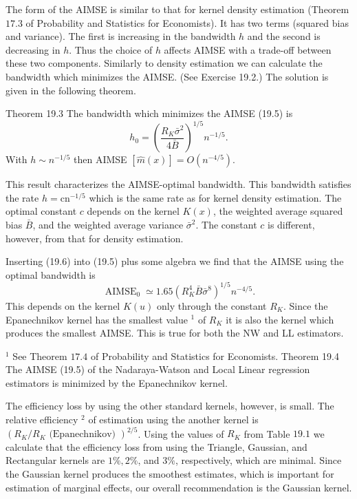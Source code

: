 \documentclass[10pt]{article}
\begin{document}
The form of the AIMSE is similar to that for kernel density estimation (Theorem $17.3$ of Probability and Statistics for Economists). It has two terms (squared bias and variance). The first is increasing in the bandwidth $h$ and the second is decreasing in $h$. Thus the choice of $h$ affects AIMSE with a trade-off between these two components. Similarly to density estimation we can calculate the bandwidth which minimizes the AIMSE. (See Exercise 19.2.) The solution is given in the following theorem.

Theorem 19.3 The bandwidth which minimizes the AIMSE (19.5) is
$$
h_{0}=\left(\frac{R_{K} \bar{\sigma}^{2}}{4 \bar{B}}\right)^{1 / 5} n^{-1 / 5} .
$$
With $h \sim n^{-1 / 5}$ then AIMSE $[\widehat{m}(x)]=O\left(n^{-4 / 5}\right)$.

This result characterizes the AIMSE-optimal bandwidth. This bandwidth satisfies the rate $h=\mathrm{cn}^{-1 / 5}$ which is the same rate as for kernel density estimation. The optimal constant $c$ depends on the kernel $K(x)$, the weighted average squared bias $\bar{B}$, and the weighted average variance $\bar{\sigma}^{2}$. The constant $c$ is different, however, from that for density estimation.

Inserting (19.6) into (19.5) plus some algebra we find that the AIMSE using the optimal bandwidth is
$$
\operatorname{AIMSE}_{0} \simeq 1.65\left(R_{K}^{4} \bar{B} \bar{\sigma}^{8}\right)^{1 / 5} n^{-4 / 5} .
$$
This depends on the kernel $K(u)$ only through the constant $R_{K}$. Since the Epanechnikov kernel has the smallest value ${ }^{1}$ of $R_{K}$ it is also the kernel which produces the smallest AIMSE. This is true for both the NW and LL estimators.

${ }^{1}$ See Theorem $17.4$ of Probability and Statistics for Economists. Theorem 19.4 The AIMSE (19.5) of the Nadaraya-Watson and Local Linear regression estimators is minimized by the Epanechnikov kernel.

The efficiency loss by using the other standard kernels, however, is small. The relative efficiency ${ }^{2}$ of estimation using the another kernel is $\left(R_{K} / R_{K} \text { (Epanechnikov) }\right)^{2 / 5}$. Using the values of $R_{K}$ from Table $19.1$ we calculate that the efficiency loss from using the Triangle, Gaussian, and Rectangular kernels are $1 \%, 2 \%$, and $3 \%$, respectively, which are minimal. Since the Gaussian kernel produces the smoothest estimates, which is important for estimation of marginal effects, our overall recommendation is the Gaussian kernel.
\end{document}
